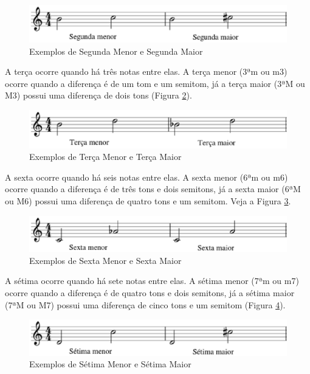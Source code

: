         \begin{figure}[htb]
          \centering
          \includegraphics[scale=0.8]{figuras/segundas.eps}
          \caption{Exemplos de Segunda Menor e Segunda Maior}
          \label{segundas}
        \end{figure}


        A terça ocorre quando há três notas entre elas. A terça menor (3ªm ou m3) ocorre quando a diferença é de um tom e um semitom, já a terça maior (3ªM ou M3) possui uma diferença de dois tons (Figura \ref{tercas}).

        \begin{figure}[htb]
          \centering
          \includegraphics[scale=0.8]{figuras/tercas.eps}
          \caption{Exemplos de Terça Menor e Terça Maior}
          \label{tercas}
        \end{figure}

        A sexta ocorre quando há seis notas entre elas. A sexta menor (6ªm ou m6) ocorre quando a diferença é de três tons e dois semitons, já a sexta maior (6ªM ou M6) possui uma diferença de quatro tons e um semitom. Veja a Figura \ref{sextas}.

        \begin{figure}[htb]
          \centering
          \includegraphics[scale=0.8]{figuras/sextas.eps}
          \caption{Exemplos de Sexta Menor e Sexta Maior}
          \label{sextas}
        \end{figure}

        A sétima ocorre quando há sete notas entre elas. A sétima menor (7ªm ou m7) ocorre quando a diferença é de quatro tons e dois semitons, já a sétima maior (7ªM ou M7) possui uma diferença de cinco tons e um semitom (Figura \ref{setimas}).

        \begin{figure}[htb]
          \centering
          \includegraphics[scale=0.8]{figuras/setimas.eps}
          \caption{Exemplos de Sétima Menor e Sétima Maior}
          \label{setimas}
        \end{figure}


